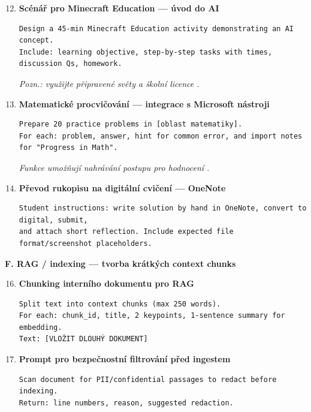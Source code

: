 \documentclass{report}%
\begin{document}
\begin{enumerate}
  \setcounter{enumi}{11}
  \item \textbf{Scénář pro Minecraft Education — úvod do AI}
  \begin{verbatim}
Design a 45-min Minecraft Education activity demonstrating an AI concept.
Include: learning objective, step-by-step tasks with times, discussion Qs, homework.
  \end{verbatim}
  \textit{Pozn.: využijte připravené světy a školní licence \cite{kb_ai_101_tipu_pdf_04e4a115_page_15_2}.}
  \item \textbf{Matematické procvičování — integrace s Microsoft nástroji}
  \begin{verbatim}
Prepare 20 practice problems in [oblast matematiky].
For each: problem, answer, hint for common error, and import notes for "Progress in Math".
  \end{verbatim}
  \textit{Funkce umožňují nahrávání postupu pro hodnocení \cite{kb_ai_101_tipu_pdf_04e4a115_page_8_1}.}
  \item \textbf{Převod rukopisu na digitální cvičení — OneNote}
  \begin{verbatim}
Student instructions: write solution by hand in OneNote, convert to digital, submit,
and attach short reflection. Include expected file format/screenshot placeholders.
  \end{verbatim}
\end{enumerate}

\medskip

\textbf{F. RAG / indexing — tvorba krátkých context chunks}

\begin{enumerate}
  \setcounter{enumi}{15}
  \item \textbf{Chunking interního dokumentu pro RAG}
  \begin{verbatim}
Split text into context chunks (max 250 words).
For each: chunk_id, title, 2 keypoints, 1-sentence summary for embedding.
Text: [VLOŽIT DLOUHÝ DOKUMENT]
  \end{verbatim}
  \item \textbf{Prompt pro bezpečnostní filtrování před ingestem}
  \begin{verbatim}
Scan document for PII/confidential passages to redact before indexing.
Return: line numbers, reason, suggested redaction.
  \end{verbatim}
\end{enumerate}

\medskip
\end{document}
